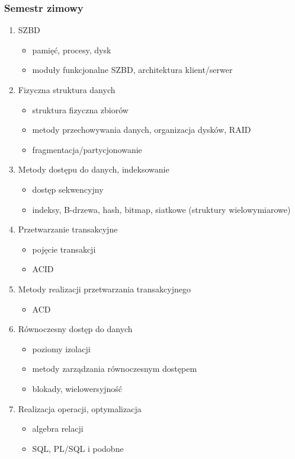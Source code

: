 \documentclass[12pt]{article}
\begin{document}
\subsubsection{Semestr zimowy}
\begin{enumerate}
\item \ac{SZBD}
\begin{itemize}
\item pamięć, procesy, dysk
\item moduły funkcjonalne \ac{SZBD}, architektura klient/serwer
\end{itemize}
\item Fizyczna struktura danych
\begin{itemize}
\item struktura fizyczna zbiorów
\item metody przechowywania danych, organizacja dysków, \acs{RAID}
\item fragmentacja/partycjonowanie
\end{itemize}
\item Metody dostępu do danych, indeksowanie
\begin{itemize}
\item dostęp sekwencyjny
\item indeksy, B-drzewa, hash, bitmap, siatkowe (struktury wielowymiarowe)
\end{itemize}
\item Przetwarzanie transakcyjne
\begin{itemize}
\item pojęcie transakcji
\item \ac{ACID}
\end{itemize}
\item Metody realizacji przetwarzania transakcyjnego
\begin{itemize}
\item ACD
\end{itemize}
\item Równoczesny dostęp do danych
\begin{itemize}
\item poziomy izolacji
\item metody zarządzania równoczesnym dostępem
\item blokady, wielowersyjność
\end{itemize}
\item Realizacja operacji, optymalizacja
\begin{itemize}
\item algebra relacji
\item SQL, PL/SQL i podobne

\end{itemize}
\end{enumerate}
\end{document}
